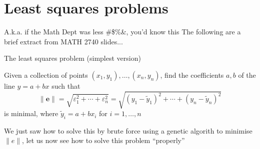 \documentclass[aspectratio=169]{beamer}
\begin{document}

\section{Least squares problems}

\begin{frame}{A.k.a. if the Math Dept was less \#\$\%\&, you'd know this}
	The following are a brief extract from MATH 2740 slides...
\end{frame}


\begin{frame}{The least squares problem (simplest version)}
	\begin{definition}
		Given a collection of points $(x_1,y_1),\ldots,(x_n,y_n)$, find the coefficients $a,b$ of the line $y=a+bx$ such that
		$$
		\|\mathbf{e}\|=\sqrt{\varepsilon_1^2+\cdots+\varepsilon_n^2}
		=\sqrt{(y_1-\tilde y_1)^2+\cdots+(y_n-\tilde y_n)^2}
		$$
		is minimal, where $\tilde y_i=a+bx_i$ for $i=1,\ldots,n$
	\end{definition}
	\vfill
	We just saw how to solve this by brute force using a genetic algorith to minimise $\|e\|$, let us now see how to solve this problem ``properly''
\end{frame}
\end{document}
